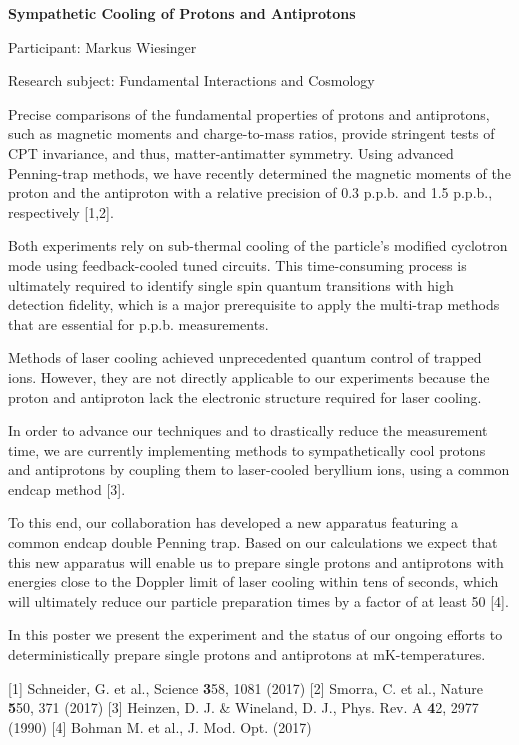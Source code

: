 \hfill 

\begin{minipage}[t]{1.0\textwidth}

\begin{center}

{{\large\bfseries Sympathetic Cooling of Protons and Antiprotons}\par}

\end{center}

{\noindent Participant: Markus Wiesinger\par} 

{\noindent Research subject: Fundamental Interactions and Cosmology\par}\medskip

\noindent Precise comparisons of the fundamental properties of protons and antiprotons, such as magnetic moments and charge-to-mass ratios, provide stringent tests of CPT invariance, and thus, matter-antimatter symmetry. Using advanced Penning-trap methods, we have recently determined the magnetic moments of the proton and the antiproton with a relative precision of 0.3 p.p.b. and 1.5 p.p.b., respectively [1,2].

Both experiments rely on sub-thermal cooling of the particle's modified cyclotron mode using feedback-cooled tuned circuits. This time-consuming process is ultimately required to identify single spin quantum transitions with high detection fidelity, which is a major prerequisite to apply the multi-trap methods that are essential for p.p.b. measurements.

Methods of laser cooling achieved unprecedented quantum control of trapped ions. However, they are not directly applicable to our experiments because the proton and antiproton lack the electronic structure required for laser cooling.

In order to advance our techniques and to drastically reduce the measurement time, we are currently implementing methods to sympathetically cool protons and antiprotons by coupling them to laser-cooled beryllium ions, using a common endcap method [3].

To this end, our collaboration has developed a new apparatus featuring a common endcap double Penning trap. Based on our calculations we expect that this new apparatus will enable us to prepare single protons and antiprotons with energies close to the Doppler limit of laser cooling within tens of seconds, which will ultimately reduce our particle preparation times by a factor of at least 50 [4].

In this poster we present the experiment and the status of our ongoing efforts to deterministically prepare single protons and antiprotons at mK-temperatures.

[1] Schneider, G. { et al}., Science {\textbf358}, 1081 (2017)
[2] Smorra, C. { et al.}, Nature {\textbf 550}, 371 (2017)
[3] Heinzen, D. J. \& Wineland, D. J., Phys. Rev. A {\textbf 42}, 2977 (1990)
[4] Bohman M. { et al.}, J. Mod. Opt. (2017)\par\end{minipage}

